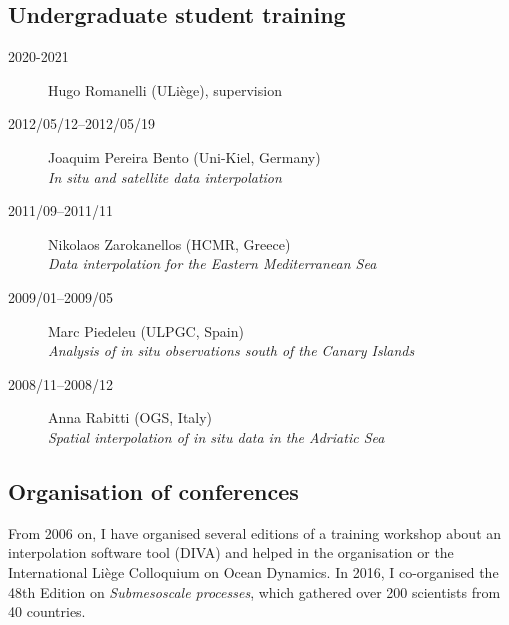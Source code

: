 \documentclass[10pt,a4paper,svgnames]{article}
\begin{document}
\subsection{Undergraduate student training}
\begin{description}
\item[2020-2021] Hugo Romanelli (ULiège), supervision
\item[2012/05/12--2012/05/19] Joaquim Pereira Bento (Uni-Kiel, Germany)\\ \textit{In situ and satellite data interpolation}
\item[2011/09--2011/11] Nikolaos Zarokanellos (HCMR, Greece) \\ \textit{Data interpolation for the Eastern Mediterranean Sea}
\item[2009/01--2009/05] Marc Piedeleu (ULPGC, Spain)\\ \textit{Analysis of in situ observations south of the Canary Islands}
\item[2008/11--2008/12] Anna Rabitti (OGS, Italy)\\ \textit{Spatial interpolation of in situ data in the Adriatic Sea}
\end{description}

\subsection{Organisation of conferences}

\begin{summarybox}
From 2006 on, I have organised several editions of a training workshop about an interpolation software tool (DIVA) and helped in the organisation or the International Li\`{e}ge Colloquium on Ocean Dynamics. In 2016, I co-organised the 48th Edition on \textit{Submesoscale processes}, which gathered over 200 scientists from 40 countries.
\end{summarybox}
\end{document}
